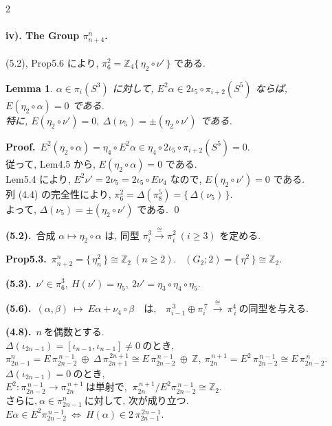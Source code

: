 \documentclass[10pt, leqno]{ltjsarticle}
\newcommand{\gen}[1]{\{\,#1\,\}}       %
\newcommand{\pit}[2]{\pi_{#1}^{#2}}
\numberwithin{equation}{section}
\theoremstyle{plain}
\newtheorem{lemma}[theorem]{Lemma}
\theoremstyle{definition}
\theoremstyle{remark}
\begin{document}
\begin{paracol}{2}
\paragraph*{iv). The Group \(\pi^{n}_{n+4}\).}

(5.2), Prop5.6 により, 
\(\pi_6^2=\mathbb Z_4\gen{\eta_2\circ\nu'}\) である. 

\begin{lemma}\label{lemma:5.7}
\(\alpha\in\pi_i(S^3)\) に対して,
\(E^2\alpha\in2\iota_5\circ\pi_{i+2}(S^5)\) ならば, 
\(E(\eta_2\circ\alpha)=0\) である. \\
特に, \(E(\eta_2\circ\nu')=0, \ \Delta(\nu_5)=\pm(\eta_2\circ\nu')\) である. 
\end{lemma}

\noindent
\textbf{Proof.}\ 
\(E^{2}(\eta_2\circ \alpha)
=\eta_4\circ E^2\alpha\in\eta_4\circ2\iota_5\circ\pi_{i+2}(S^5)=0.\)\\
従って, Lem4.5 から,
\(E(\eta_2\circ \alpha)=0\) である.\\
Lem5.4 により, \(E^2\nu'=2\nu_5=2\iota_5\circ E\nu_4\) なので, 
\(E(\eta_2\circ \nu')=0\) である. \\
列 (4.4) の完全性により,
\(\pi^{2}_{6}=\Delta(\pi^{5}_{8})=\gen{\Delta(\nu_5)} .\)\\
よって, \(\Delta(\nu_5)=\pm(\eta_2\circ\nu')\) である. 
\qed

\switchcolumn

\noindent
\textbf{(5.2).}\
\(\text{合成 } \alpha\longmapsto \eta_2\circ \alpha \text{ は, 同型 } 
\pi^{3}_{i}\xrightarrow{\cong}\pi^{2}_{i}\ (i\ge3) 
\text{ を定める. }\)

\noindent
\textbf{Prop5.3.}\
\(\pi^{n}_{n+2}=\gen{\eta_n^{2}}\cong \mathbb Z_2\ (n\ge2).\) \
\((G_2;2)=\gen{\eta^{2}}\cong \mathbb Z_2 .\)

\noindent
\textbf{(5.3).}\
\(\nu'\in\pi_6^3,\ H(\nu')=\eta_5,\ 2\nu'=\eta_3\circ\eta_4\circ\eta_5 .\)

\noindent
\textbf{(5.6).}\
\((\alpha,\beta)\ \longmapsto\ E\alpha+\nu_{4}\circ\beta
\quad\text{は,}\quad
\pi^{\,3}_{i-1}\oplus \pi^{\,7}_{i}\ \xrightarrow{\ \cong\ }\ \pi_{\,i}^{4}
\ \text{の同型を与える. }\)

\noindent
\textbf{(4.8).}\
\( n \ \text{を偶数とする. } \)\\
\(\Delta(\iota_{2n-1})=[\iota_{n-1},\iota_{n-1}]\ne0 \ \text{のとき, }\)\\
\(\pit{2n-1}{n}
=E\,\pit{2n-2}{\,n-1}\ \oplus\ \Delta\,\pit{2n+1}{\,2n+1}
\cong E\,\pit{2n-2}{\,n-1}\ \oplus\ \mathbb{Z},\ \pit{2n}{\,n+1} = E^{2}\,\pit{2n-2}{\,n-1} 
\cong E\,\pit{2n-2}{\,n}.\)\\
\(\Delta(\iota_{2n-1})=0 \ \text{のとき, }\)\\
\(E^{2}:\pit{2n-2}{\,n-1}\to\pit{2n}{\,n+1}\ \text{は単射で, }\
\pit{2n}{\,n+1}/E^{2}\pit{2n-2}{\,n-1}\cong\mathbb{Z}_2 . \)\\
\(\text{さらに,}\ \alpha\in\pit{2n-1}{n} \ \text{に対して, 次が成り立つ. }\)\\
\(E\alpha\in E^{2}\pit{2n-2}{\,n-1} \ \Leftrightarrow \
H(\alpha)\in 2\,\pit{2n-1}{\,2n-1} .\)


\end{paracol}
\end{document}
